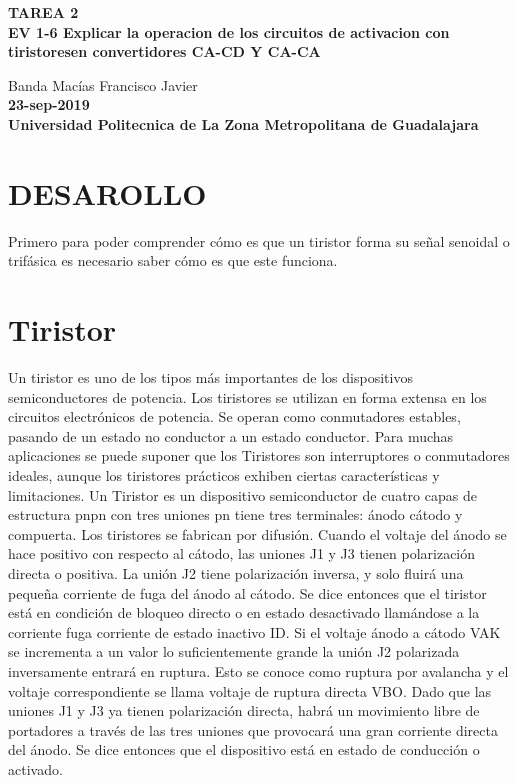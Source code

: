 \documentclass[11pt,a4paper]{article}
\begin{document}
\begin{center}
\textbf{TAREA 2}\\
\textbf{EV 1-6 Explicar la operacion de los circuitos de activacion con tiristoresen convertidores CA-CD Y CA-CA}
\end{center}

\begin{center}
Banda Macías Francisco Javier\\
\textbf{23-sep-2019}\\
\textbf{Universidad Politecnica de La Zona Metropolitana de Guadalajara}
\end{center}

\section{DESAROLLO}
Primero para poder comprender cómo es que un tiristor forma su señal senoidal o trifásica es necesario saber cómo es que este funciona.\\
\section{Tiristor}
Un tiristor es uno de los tipos más importantes de los dispositivos semiconductores de potencia. Los tiristores se utilizan en forma extensa en los circuitos electrónicos de potencia. Se operan como conmutadores estables, pasando de un estado no conductor a un estado conductor. Para muchas aplicaciones se puede suponer que los Tiristores son interruptores o conmutadores ideales, aunque los tiristores prácticos exhiben ciertas características y limitaciones.
Un Tiristor es un dispositivo semiconductor de cuatro capas de estructura pnpn con tres uniones pn tiene tres terminales: ánodo cátodo y compuerta. Los tiristores se fabrican por difusión.
Cuando el voltaje del ánodo se hace positivo con respecto al cátodo, las uniones J1 y J3 tienen polarización directa o positiva. La unión J2 tiene polarización inversa, y solo fluirá una pequeña corriente de fuga del ánodo al cátodo. Se dice entonces que el tiristor está en condición de bloqueo directo o en estado desactivado llamándose a la corriente fuga corriente de estado inactivo ID. Si el voltaje ánodo a cátodo VAK se incrementa a un valor lo suficientemente grande la unión J2 polarizada inversamente entrará en ruptura. Esto se conoce como ruptura por avalancha y el voltaje correspondiente se llama voltaje de ruptura directa VBO. Dado que las uniones J1 y J3 ya tienen polarización directa, habrá un movimiento libre de portadores a través de las tres uniones que provocará una gran corriente directa del ánodo. Se dice entonces que el dispositivo está en estado de conducción o activado.\\
\end{document}
